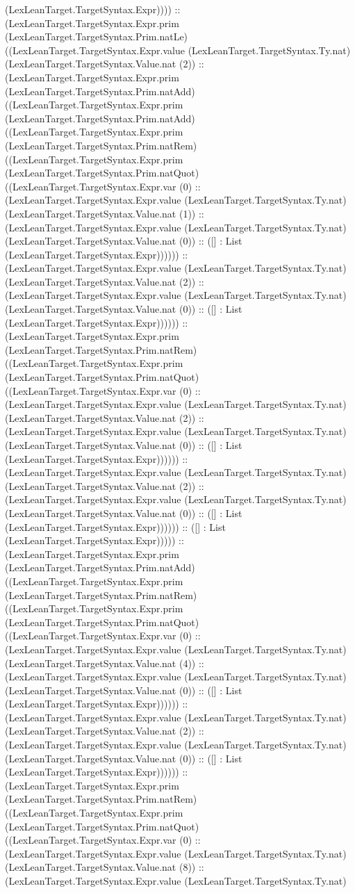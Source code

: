 \documentclass[11pt]{article}
\begin{document}
(LexLeanTarget.TargetSyntax.Expr)))) :: (LexLeanTarget.TargetSyntax.Expr.prim (LexLeanTarget.TargetSyntax.Prim.natLe) ((LexLeanTarget.TargetSyntax.Expr.value (LexLeanTarget.TargetSyntax.Ty.nat) (LexLeanTarget.TargetSyntax.Value.nat (2)) :: (LexLeanTarget.TargetSyntax.Expr.prim (LexLeanTarget.TargetSyntax.Prim.natAdd) ((LexLeanTarget.TargetSyntax.Expr.prim (LexLeanTarget.TargetSyntax.Prim.natAdd) ((LexLeanTarget.TargetSyntax.Expr.prim (LexLeanTarget.TargetSyntax.Prim.natRem) ((LexLeanTarget.TargetSyntax.Expr.prim (LexLeanTarget.TargetSyntax.Prim.natQuot) ((LexLeanTarget.TargetSyntax.Expr.var (0) :: (LexLeanTarget.TargetSyntax.Expr.value (LexLeanTarget.TargetSyntax.Ty.nat) (LexLeanTarget.TargetSyntax.Value.nat (1)) :: (LexLeanTarget.TargetSyntax.Expr.value (LexLeanTarget.TargetSyntax.Ty.nat) (LexLeanTarget.TargetSyntax.Value.nat (0)) :: ([] : List (LexLeanTarget.TargetSyntax.Expr)))))) :: (LexLeanTarget.TargetSyntax.Expr.value (LexLeanTarget.TargetSyntax.Ty.nat) (LexLeanTarget.TargetSyntax.Value.nat (2)) :: (LexLeanTarget.TargetSyntax.Expr.value (LexLeanTarget.TargetSyntax.Ty.nat) (LexLeanTarget.TargetSyntax.Value.nat (0)) :: ([] : List (LexLeanTarget.TargetSyntax.Expr)))))) :: (LexLeanTarget.TargetSyntax.Expr.prim (LexLeanTarget.TargetSyntax.Prim.natRem) ((LexLeanTarget.TargetSyntax.Expr.prim (LexLeanTarget.TargetSyntax.Prim.natQuot) ((LexLeanTarget.TargetSyntax.Expr.var (0) :: (LexLeanTarget.TargetSyntax.Expr.value (LexLeanTarget.TargetSyntax.Ty.nat) (LexLeanTarget.TargetSyntax.Value.nat (2)) :: (LexLeanTarget.TargetSyntax.Expr.value (LexLeanTarget.TargetSyntax.Ty.nat) (LexLeanTarget.TargetSyntax.Value.nat (0)) :: ([] : List (LexLeanTarget.TargetSyntax.Expr)))))) :: (LexLeanTarget.TargetSyntax.Expr.value (LexLeanTarget.TargetSyntax.Ty.nat) (LexLeanTarget.TargetSyntax.Value.nat (2)) :: (LexLeanTarget.TargetSyntax.Expr.value (LexLeanTarget.TargetSyntax.Ty.nat) (LexLeanTarget.TargetSyntax.Value.nat (0)) :: ([] : List (LexLeanTarget.TargetSyntax.Expr)))))) :: ([] : List (LexLeanTarget.TargetSyntax.Expr))))) :: (LexLeanTarget.TargetSyntax.Expr.prim (LexLeanTarget.TargetSyntax.Prim.natAdd) ((LexLeanTarget.TargetSyntax.Expr.prim (LexLeanTarget.TargetSyntax.Prim.natRem) ((LexLeanTarget.TargetSyntax.Expr.prim (LexLeanTarget.TargetSyntax.Prim.natQuot) ((LexLeanTarget.TargetSyntax.Expr.var (0) :: (LexLeanTarget.TargetSyntax.Expr.value (LexLeanTarget.TargetSyntax.Ty.nat) (LexLeanTarget.TargetSyntax.Value.nat (4)) :: (LexLeanTarget.TargetSyntax.Expr.value (LexLeanTarget.TargetSyntax.Ty.nat) (LexLeanTarget.TargetSyntax.Value.nat (0)) :: ([] : List (LexLeanTarget.TargetSyntax.Expr)))))) :: (LexLeanTarget.TargetSyntax.Expr.value (LexLeanTarget.TargetSyntax.Ty.nat) (LexLeanTarget.TargetSyntax.Value.nat (2)) :: (LexLeanTarget.TargetSyntax.Expr.value (LexLeanTarget.TargetSyntax.Ty.nat) (LexLeanTarget.TargetSyntax.Value.nat (0)) :: ([] : List (LexLeanTarget.TargetSyntax.Expr)))))) :: (LexLeanTarget.TargetSyntax.Expr.prim (LexLeanTarget.TargetSyntax.Prim.natRem) ((LexLeanTarget.TargetSyntax.Expr.prim (LexLeanTarget.TargetSyntax.Prim.natQuot) ((LexLeanTarget.TargetSyntax.Expr.var (0) :: (LexLeanTarget.TargetSyntax.Expr.value (LexLeanTarget.TargetSyntax.Ty.nat) (LexLeanTarget.TargetSyntax.Value.nat (8)) :: (LexLeanTarget.TargetSyntax.Expr.value (LexLeanTarget.TargetSyntax.Ty.nat) 
\end{document}
